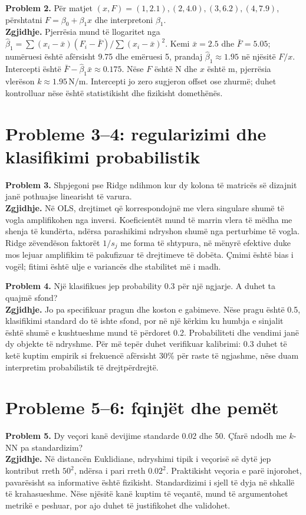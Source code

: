 \documentclass[12pt,a4paper,oneside]{book}
\begin{document}
\textbf{Problem 2.} Për matjet $(x,F)=(1,2.1),(2,4.0),(3,6.2),(4,7.9)$, përshtatni $F=\beta_0+\beta_1x$ dhe interpretoni $\beta_1$.\\
\textbf{Zgjidhje.} Pjerrësia mund të llogaritet nga $\hat\beta_1=\sum(x_i-\bar x)(F_i-\bar F)/\sum(x_i-\bar x)^2$. Kemi $\bar x=2.5$ dhe $\bar F=5.05$; numëruesi është afërsisht 9.75 dhe emëruesi 5, prandaj $\hat\beta_1\approx1.95$ në njësitë $F/x$. Intercepti është $\bar F-\hat\beta_1\bar x\approx0.175$. Nëse $F$ është N dhe $x$ është m, pjerrësia vlerëson $k\approx1.95\,\mathrm{N/m}$. Intercepti jo zero sugjeron offset ose zhurmë; duhet kontrolluar nëse është statistikisht dhe fizikisht domethënës.

\section{Probleme 3--4: regularizimi dhe klasifikimi probabilistik}
\textbf{Problem 3.} Shpjegoni pse Ridge ndihmon kur dy kolona të matricës së dizajnit janë pothuajse linearisht të varura.\\
\textbf{Zgjidhje.} Në OLS, drejtimet që korrespondojnë me vlera singulare shumë të vogla amplifikohen nga inversi. Koeficientët mund të marrin vlera të mëdha me shenja të kundërta, ndërsa parashikimi ndryshon shumë nga perturbime të vogla. Ridge zëvendëson faktorët $1/s_j$ me forma të shtypura, në mënyrë efektive duke mos lejuar amplifikim të pakufizuar të drejtimeve të dobëta. Çmimi është bias i vogël; fitimi është ulje e variancës dhe stabilitet më i madh.

\textbf{Problem 4.} Një klasifikues jep probability 0.3 për një ngjarje. A duhet ta quajmë sfond?\\
\textbf{Zgjidhje.} Jo pa specifikuar pragun dhe koston e gabimeve. Nëse pragu është 0.5, klasifikimi standard do të ishte sfond, por në një kërkim ku humbja e sinjalit është shumë e kushtueshme mund të përdoret 0.2. Probabiliteti dhe vendimi janë dy objekte të ndryshme. Për më tepër duhet verifikuar kalibrimi: 0.3 duhet të ketë kuptim empirik si frekuencë afërsisht 30\% për raste të ngjashme, nëse duam interpretim probabilistik të drejtpërdrejtë.

\section{Probleme 5--6: fqinjët dhe pemët}
\textbf{Problem 5.} Dy veçori kanë devijime standarde 0.02 dhe 50. Çfarë ndodh me $k$-NN pa standardizim?\\
\textbf{Zgjidhje.} Në distancën Euklidiane, ndryshimi tipik i veçorisë së dytë jep kontribut rreth $50^2$, ndërsa i pari rreth $0.02^2$. Praktikisht veçoria e parë injorohet, pavarësisht sa informative është fizikisht. Standardizimi i sjell të dyja në shkallë të krahasueshme. Nëse njësitë kanë kuptim të veçantë, mund të argumentohet metrikë e peshuar, por ajo duhet të justifikohet dhe validohet.
\end{document}
